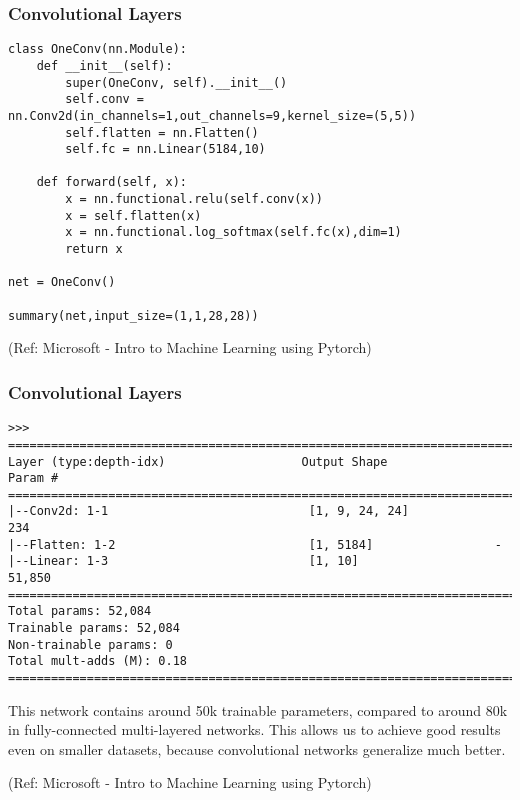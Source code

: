 \begin{frame}[fragile] \frametitle{Convolutional Layers}

\begin{lstlisting}
class OneConv(nn.Module):
    def __init__(self):
        super(OneConv, self).__init__()
        self.conv = nn.Conv2d(in_channels=1,out_channels=9,kernel_size=(5,5))
        self.flatten = nn.Flatten()
        self.fc = nn.Linear(5184,10)

    def forward(self, x):
        x = nn.functional.relu(self.conv(x))
        x = self.flatten(x)
        x = nn.functional.log_softmax(self.fc(x),dim=1)
        return x

net = OneConv()

summary(net,input_size=(1,1,28,28))

\end{lstlisting}

\tiny{(Ref: Microsoft - Intro to Machine Learning using Pytorch)}
\end{frame}

\begin{frame}[fragile] \frametitle{Convolutional Layers}

\begin{lstlisting}
>>>
==========================================================================
Layer (type:depth-idx)                   Output Shape              Param #
==========================================================================
|--Conv2d: 1-1                            [1, 9, 24, 24]            234
|--Flatten: 1-2                           [1, 5184]                 -
|--Linear: 1-3                            [1, 10]                   51,850
==========================================================================
Total params: 52,084
Trainable params: 52,084
Non-trainable params: 0
Total mult-adds (M): 0.18
==========================================================================
\end{lstlisting}

This network contains around 50k trainable parameters, compared to around 80k in fully-connected multi-layered networks. This allows us to achieve good results even on smaller datasets, because convolutional networks generalize much better.

\tiny{(Ref: Microsoft - Intro to Machine Learning using Pytorch)}
\end{frame}


